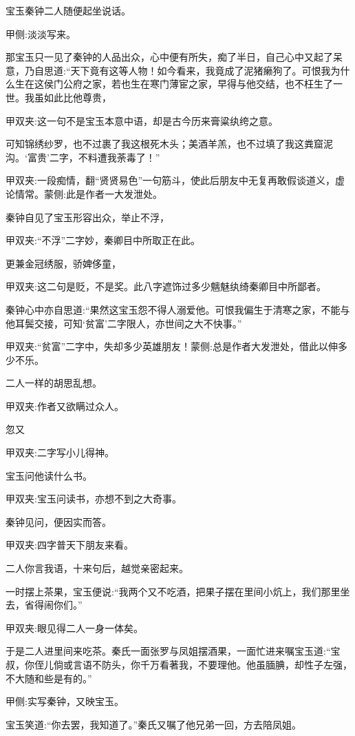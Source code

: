 \begin{parag}
    宝玉秦钟二人随便起坐说话。\begin{note}甲侧:淡淡写来。\end{note}那宝玉只一见了秦钟的人品出众，心中便有所失，痴了半日，自己心中又起了呆意，乃自思道:“天下竟有这等人物！如今看来，我竟成了泥猪癞狗了。可恨我为什么生在这侯门公府之家，若也生在寒门薄宦之家，早得与他交结，也不枉生了一世。我虽如此比他尊贵，\begin{note}甲双夹:这一句不是宝玉本意中语，却是古今历来膏粱纨绔之意。\end{note}可知锦绣纱罗，也不过裹了我这根死木头；美酒羊羔，也不过填了我这粪窟泥沟。‘富贵’二字，不料遭我荼毒了！”\begin{note}甲双夹:一段痴情，翻“贤贤易色”一句筋斗，使此后朋友中无复再敢假谈道义，虚论情常。蒙侧:此是作者一大发泄处。\end{note}秦钟自见了宝玉形容出众，举止不浮，\begin{note}甲双夹:“不浮”二字妙，秦卿目中所取正在此。\end{note}更兼金冠绣服，骄婢侈童，\begin{note}甲双夹:这二句是贬，不是奖。此八字遮饰过多少魑魅纨绮秦卿目中所鄙者。\end{note}秦钟心中亦自思道:“果然这宝玉怨不得人溺爱他。可恨我偏生于清寒之家，不能与他耳鬓交接，可知‘贫富’二字限人，亦世间之大不快事。”\begin{note}甲双夹:“贫富”二字中，失却多少英雄朋友！蒙侧:总是作者大发泄处，借此以伸多少不乐。\end{note}二人一样的胡思乱想。\begin{note}甲双夹:作者又欲瞒过众人。\end{note}忽又\begin{note}甲双夹:二字写小儿得神。\end{note}宝玉问他读什么书。\begin{note}甲双夹:宝玉问读书，亦想不到之大奇事。\end{note}秦钟见问，便因实而答。\begin{note}甲双夹:四字普天下朋友来看。\end{note}二人你言我语，十来句后，越觉亲密起来。
\end{parag}


\begin{parag}
    一时摆上茶果，宝玉便说:“我两个又不吃酒，把果子摆在里间小炕上，我们那里坐去，省得闹你们。”\begin{note}甲双夹:眼见得二人一身一体矣。\end{note}于是二人进里间来吃茶。秦氏一面张罗与凤姐摆酒果，一面忙进来嘱宝玉道:“宝叔，你侄儿倘或言语不防头，你千万看著我，不要理他。他虽腼腆，却性子左强，不大随和些是有的。”\begin{note}甲侧:实写秦钟，又映宝玉。\end{note}宝玉笑道:“你去罢，我知道了。”秦氏又嘱了他兄弟一回，方去陪凤姐。
\end{parag}


